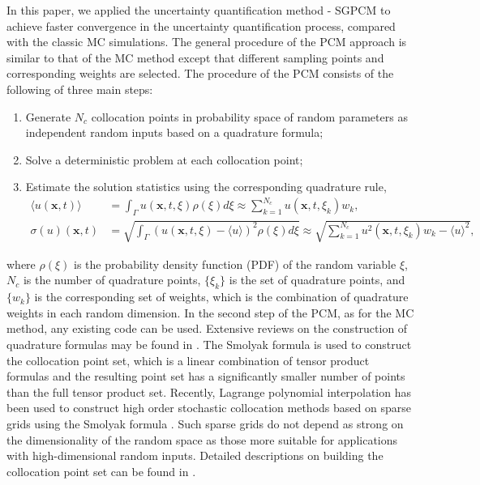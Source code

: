 In this paper, we applied the uncertainty quantification method -
SGPCM to achieve faster convergence in the uncertainty
quantification process, compared with the classic MC simulations.
The general procedure of the PCM approach is similar to that of the
MC method except that different sampling points and corresponding
weights are selected. The procedure of the PCM consists of the
following of three main steps:
\begin{enumerate}
  \item Generate $N_c$ collocation points in probability space of
random parameters as independent random inputs based on a quadrature
formula;
  \item Solve a deterministic problem at each collocation point;
  \item Estimate the solution statistics using the
corresponding quadrature rule,
%
\begin{align}\label{eq:statis}
\langle u(\boldsymbol{x},t)\rangle&=\int_\Gamma
u(\boldsymbol{x},t,\xi)\rho(\xi)d\xi \approx
\sum_{k=1}^{N_c}{u(\boldsymbol{x},t,\xi_k)w_k},
\\ \sigma(u)(\boldsymbol{x},t)&=\sqrt{\int_\Gamma
(u(\boldsymbol{x},t,\xi)-\langle u\rangle)^2 \rho(\xi)d\xi} \approx
\sqrt{\sum_{k=1}^{N_c}{u^2(\boldsymbol{x},t,\xi_k)w_k}-\langle
u\rangle^2},
\end{align}
%
\end{enumerate}
where $\rho(\xi)$ is the probability density function (PDF) of the
random variable $\xi$, $N_c$ is the number of quadrature points,
$\{\xi_k\}$ is the set of quadrature points, and $\{w_k\}$ is the
corresponding set of weights, which is the combination of quadrature
weights in each random dimension. In the second step of the PCM, as
for the MC method, any existing code can be used. Extensive reviews
on the construction of quadrature formulas may be found in
\cite{Cools93, Cools99}. The Smolyak formula \cite{SMOLYAK63} is
used to construct the collocation point set, which is a linear
combination of tensor product formulas and the resulting point set
has a significantly smaller number of points than the full tensor
product set. Recently, Lagrange polynomial interpolation has been
used \cite{DBJSH, LinAMTAWR, LinAMTJSC} to construct high order
stochastic collocation methods based on sparse grids using the
Smolyak formula \cite{SMOLYAK63}. Such sparse grids do not depend as
strong on the dimensionality of the random space as those more
suitable for applications with high-dimensional random inputs.
Detailed descriptions on building the collocation point set can be
found in \cite{DBJSH, LinAMTAWR, LinAMTJSC}.

